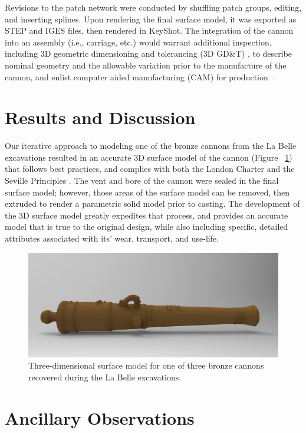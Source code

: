 \documentclass[review]{elsarticle}
\begin{document}
Revisions to the patch network were conducted by shuffling patch groups, editing, and inserting splines. Upon rendering the final surface model, it was exported as STEP and IGES files, then rendered in KeyShot. The integration of the cannon into an assembly (i.e., carriage, etc.) would warrant additional inspection, including 3D geometric dimensioning and tolerancing (3D GD\&T) \citep{RN5875,RN5874,RN5876}, to describe nominal geometry and the allowable variation prior to the manufacture of the cannon, and enlist computer aided manufacturing (CAM) for production \citep{RN5877,RN5878}.

\section*{Results and Discussion}

Our iterative approach to modeling one of the bronze cannons from the La Belle excavations resulted in an accurate 3D surface model of the cannon (Figure ~\ref{fig:Fig5}) that follows best practices, and complies with both the London Charter \citep{RN5872} and the Seville Principles \citep{RN5873}. The vent and bore of the cannon were sealed in the final surface model; however, those areas of the surface model can be removed, then extruded to render a parametric solid model prior to casting. The development of the 3D surface model greatly expedites that process, and provides an accurate model that is true to the original design, while also including specific, detailed attributes associated with its' wear, transport, and use-life.

\begin{figure}[ht]\centering
\includegraphics[width=\linewidth]{FigSurfaceModel}
\caption{Three-dimensional surface model for one of three bronze cannons recovered during the La Belle excavations.}
\label{fig:Fig5}
\end{figure}

\section*{Ancillary Observations}
\end{document}
